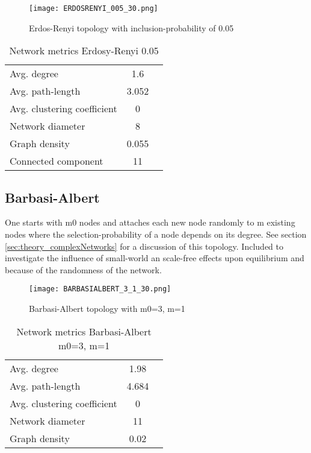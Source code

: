 \documentclass[Bachelorarbeit.tex]{subfiles}
\begin{document}
\begin{figure}[H]
	\centering
  \texttt{[image: ERDOSRENYI\_005\_30.png]}
	\caption{Erdos-Renyi topology with inclusion-probability of 0.05}
	\label{fig:topology_ERDOSRENYI_005_30}
\end{figure}

\begin{table}[h]
	\centering
	\caption{Network metrics Erdosy-Renyi 0.05}
	\begin{tabular} { l c r }
		\hline
		Avg. degree & 1.6 \\
		Avg. path-length & 3.052 \\
		Avg. clustering coefficient & 0 \\
		Network diameter & 8 \\
		Graph density & 0.055 \\
		Connected component & 11 \\
		\hline
	\end{tabular}
\end{table}

\subsection{Barbasi-Albert}
One starts with m0 nodes and attaches each new node randomly to m existing nodes where the selection-probability of a node depends on its degree. See section \ref{sec:theory_complexNetworks} for a discussion of this topology.
\medskip
Included to investigate the influence of small-world an scale-free effects upon equilibrium and because of the randomness of the network.

\begin{figure}[H]
	\centering
  \texttt{[image: BARBASIALBERT\_3\_1\_30.png]}
	\caption{Barbasi-Albert topology with m0=3, m=1}
	\label{fig:topology_BARBASIALBERT_3_1_30}
\end{figure}

\begin{table}[h]
	\centering
	\caption{Network metrics Barbasi-Albert m0=3, m=1}
	\begin{tabular} { l c r }
		\hline
		Avg. degree & 1.98 \\
		Avg. path-length & 4.684 \\
		Avg. clustering coefficient & 0 \\
		Network diameter & 11 \\
		Graph density & 0.02 \\
		\hline
	\end{tabular}
\end{table}
\end{document}

